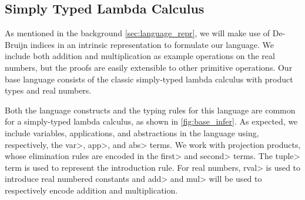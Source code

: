 \subsection{Simply Typed Lambda Calculus}\label{sec:formal_stlc}
  As mentioned in the background \cref{sec:language_repr}, we will make use of De-Bruijn indices in an intrinsic representation to formulate our language.
  We include both addition and multiplication as example operations on the real numbers, but the proofs are easily extensible to other primitive operations.
  Our base language consists of the classic simply-typed lambda calculus with product types and real numbers.

  Both the language constructs and the typing rules for this language are common for a simply-typed lambda calculus, as shown in \cref{fig:base_infer}.
  As expected, we include variables, applications, and abstractions in the language using, respectively, the \<var>, \<app>, and \<abs> terms.
  We work with projection products, whose elimination rules are encoded in the  \<first> and \<second> terms. The \<tuple> term is used to represent the introduction rule.
  For real numbers, \<rval> is used to introduce real numbered constants and \<add> and \<mul> will be used to respectively encode addition and multiplication.

